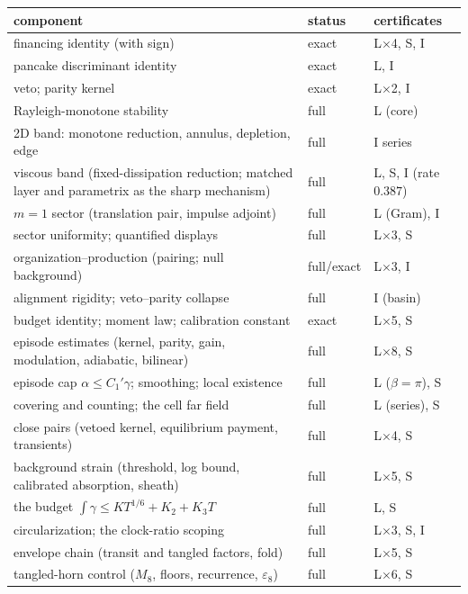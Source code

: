 \documentclass[11pt,letterpaper]{amsart}
\theoremstyle{definition}
\theoremstyle{remark}
\begin{document}
{\small
\setlength\LTleft{0pt}\setlength{}
\begin{longtable}{@{}>{\raggedright\arraybackslash}p{}ll@{}}
\toprule
component & status & certificates \\
\midrule
\endhead
financing identity (with sign) & exact & L$\times$4, S, I \\
pancake discriminant identity & exact & L, I \\
veto; parity kernel & exact & L$\times$2, I \\
Rayleigh-monotone stability & full & L (core) \\
2D band: monotone reduction, annulus, depletion, edge & full & I series \\
viscous band (fixed-dissipation reduction; matched layer and parametrix as the sharp mechanism) & full & L, S, I (rate $0.387$) \\
$m=1$ sector (translation pair, impulse adjoint) & full & L (Gram), I \\
sector uniformity; quantified displays & full & L$\times$3, S \\
organization--production (pairing; null background) & full/exact & L$\times$3, I \\
alignment rigidity; veto--parity collapse & full & I (basin) \\
budget identity; moment law; calibration constant & exact & L$\times$5, S \\
episode estimates (kernel, parity, gain, modulation, adiabatic, bilinear) & full & L$\times$8, S \\
episode cap $\alpha\le C_1'\gamma$; smoothing; local existence & full & L ($\beta=\pi$), S \\
covering and counting; the cell far field & full & L (series), S \\
close pairs (vetoed kernel, equilibrium payment, transients) & full & L$\times$4, S \\
background strain (threshold, log bound, calibrated absorption, sheath) & full & L$\times$5, S \\
the budget $\int\gamma\le KT^{1/6}+K_2+K_3T$ & full & L, S \\
circularization; the clock-ratio scoping & full & L$\times$3, S, I \\
envelope chain (transit and tangled factors, fold) & full & L$\times$5, S \\
tangled-horn control ($M_8$, floors, recurrence, $\varepsilon_8$) & full & L$\times$6, S \\

\end{longtable}}
\end{document}
